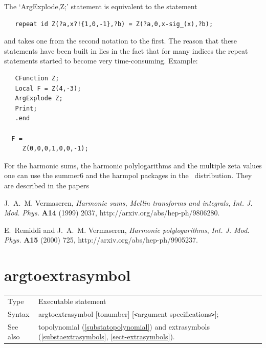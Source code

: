 \noindent The `ArgExplode,Z;' 
statement is equivalent to the statement
\begin{verbatim}
   repeat id Z(?a,x?!{1,0,-1},?b) = Z(?a,0,x-sig_(x),?b);
\end{verbatim}
and takes one from the second notation to the first. The reason that these 
statements have been built in lies in the fact that for many indices the 
repeat statements started to become very time-consuming. Example:
\begin{verbatim}
   CFunction Z;
   Local F = Z(4,-3);
   ArgExplode Z;
   Print;
   .end

  F =
     Z(0,0,0,1,0,0,-1);
\end{verbatim}

\noindent For the harmonic sums, the harmonic polylogarithms and the 
multiple zeta values one can use the summer6 and the harmpol packages in 
the \FORM\ distribution. They are described in the papers

J.~A.~M. Vermaseren, {\it Harmonic sums, Mellin transforms and integrals},
  {\em Int. J. Mod. Phys.} {\bf A14} (1999) 2037,
  http://arxiv.org/abs/hep-ph/9806280.

E.~Remiddi and J.~A.~M. Vermaseren, {\it Harmonic polylogarithms},  {\em 
Int. J. Mod. Phys.} {\bf A15} (2000) 725,
  http://arxiv.org/abs/hep-ph/9905237.
\vspace{10mm}


\section{argtoextrasymbol}
\label{substaargtoextrasymbol}

\noindent
\begin{tabular}{ll}
Type &
  Executable statement \\
Syntax &
  argtoextrasymbol [tonumber] [{\tt<}argument specifications{\tt>}]; \\
See also &
  topolynomial (\ref{substatopolynomial}) and
  extrasymbols (\ref{substaextrasymbols}, \ref{sect-extrasymbols}).
\end{tabular}
\vspace{4mm}

